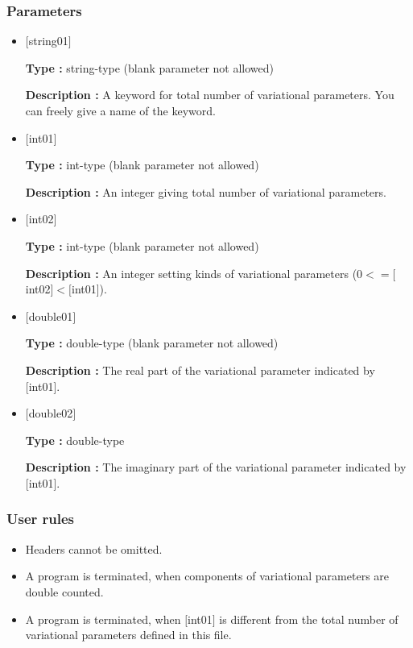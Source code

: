 \subsubsection{Parameters}
 \begin{itemize}

   \item  $[$string01$]$
   
    {\bf Type :} string-type (blank parameter not allowed)

   {\bf Description :} A keyword for total number of variational parameters. You can freely give a name of the keyword. 

   \item  $[$int01$]$
   
    {\bf Type :} int-type (blank parameter not allowed)

   {\bf Description :} An integer giving total number of variational parameters.

  \item  $[$int02$]$
  
 {\bf Type :} int-type (blank parameter not allowed)

{\bf Description :} An integer setting kinds of variational  parameters ($0<= [$int02$]<[$int01]).
 
 \item  $[$double01$]$
   
   {\bf Type :} double-type (blank parameter not allowed)

  {\bf Description :} The real part of the variational parameter indicated by [int01].
  
   \item  $[$double02$]$
   
   {\bf Type :} double-type 

  {\bf Description :} The imaginary part of the variational parameter indicated by [int01].
  
\end{itemize}

\subsubsection{User rules}
\begin{itemize}
\item Headers cannot be omitted. 
\item A program is terminated, when components of variational parameters are double counted.
\item A program is terminated, when $[$int01$]$ is different from the total number of variational parameters defined in this file.
\end{itemize}

